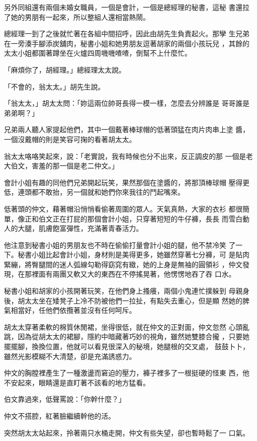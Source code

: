 另外同組還有兩個未婚女職員，一個是會計，一個是總經理的秘書，這秘
書還拉了她的男朋有一起來，所以整組人還相當熱鬧。

總經理一到了之後就忙著在各組中間招呼，因此由胡先生負責起火。那孿
生兄弟在一旁湊手腳添炭舖肉，秘書小姐和她男朋友逗著胡家的兩個小孩玩兒
，其餘的太太小姐都圍著蹲坐在火爐四周嘰嘰喳喳，倒幫不上什麼忙。

「麻煩你了，胡經理。」總經理太太說。

「不會的，翁太太。」胡先生說。

「翁太太，」胡太太問：「妳這兩位帥哥長得一模一樣，怎麼去分辨誰是
哥哥誰是弟弟啊？」

兄弟兩人聽人家提起他們，其中一個戴著棒球帽的低著頭猛在肉片肉串上塗
醬，一個沒戴帽的則是笑容可掬的看著胡太太。

翁太太咯咯笑起來，說：「老實說，我有時候也分不出來，反正調皮的那
一個是老大伯文，害羞的那一個是老二仲文。」

會計小姐有趣的同他們兄弟開起玩笑，果然那個在塗醬的，將那頂棒球帽
壓得更低，連頭都不敢抬，另一個就和她們你來我往的鬥起嘴來。

低著頭的仲文，藉著帽沿悄悄看偷著周圍的眾人。天氣真熱，大家的衣衫
都很簡單，像正和伯文正在打屁的那個會計小姐，只穿著短短的牛仔褲，長長
而雪白動人的大腿，肌膚飽富彈性，充滿著青春活力。

他注意到秘書小姐的男朋友也不時在偷偷打量會計小姐的腿，他不禁冷笑
了一下。秘書小姐比起會計小姐，身材則是美得更多，她雖然穿著七分褲，可
是貼肉緊繃，將臀腿間的迷人弧線勾勒得窈窕有緻，她的上身是無袖的圓領衫
，仲文發現，在那裡面有兩團又軟又大的東西在不停搖晃著，他愣愣地吞了吞
口水。

秘書小姐和胡家的小孩開著玩笑，在他們身上搔癢，兩個小鬼連忙撲躲到
母親身後，胡太太坐在矮凳子上冷不防被他們一拉扯，有點失去重心，但是顯
然她的脾氣相當好，任他們依攬著並沒有任何呵斥。

胡太太穿著柔軟的棉質休閒裙，坐得很低，就在仲文的正對面，仲文忽然
心頭亂跳，因為從胡太太的裙腳，隱約中暗藏著巧妙的視角，雖然她雙膝合攏
，只要她擺擺腳，換換位置，他就可以看見很深入的秘境，她腿根的交叉處，
鼓鼓卜卜，雖然光影模糊不大清楚，卻是充滿誘惑力。

仲文的胸膛裡產生了一種激盪而窘迫的壓力，褲子裡多了一根挺硬的怪東
西，他不安起來，眼睛還是直盯著不該看的地方猛看。

伯文靠過來，低聲罵說：「你幹什麼？」

仲文不搭腔，紅著臉繼續幹他的活。

突然胡太太站起來，拎著兩只水桶走開，仲文有些失望，卻也暫時鬆了一
口氣。


